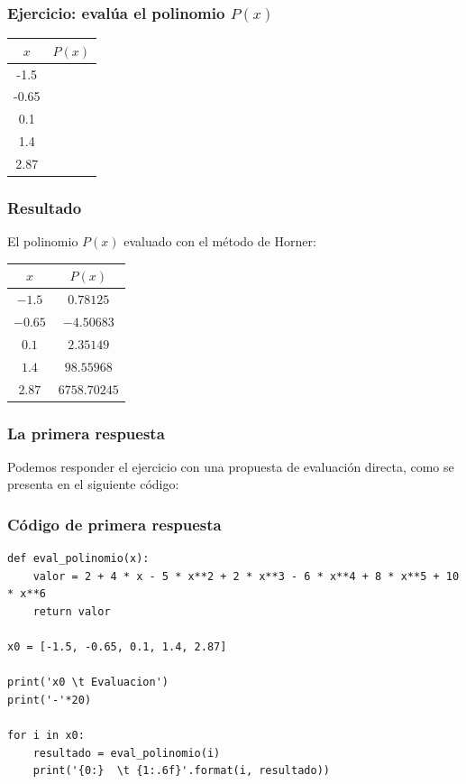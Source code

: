 \documentclass[12pt]{beamer}
\begin{document}
\begin{frame}
\frametitle{Ejercicio: evalúa el polinomio $P(x)$}
\begin{table}
\centering
\begin{tabular}{S | c}
$x$ & $P (x)$ \\
 & \\
 & \\
 & \\
 & \\
 & 
\end{tabular}
\end{table}
\end{frame}
\begin{frame}
\frametitle{Resultado}
El polinomio $P(x)$ evaluado con el método de Horner:
\\
\medskip
\renewcommand{\arraystretch}{1}
\begin{table}
\centering
\begin{tabular}{c | c }
$x$ & $P (x)$ \\
\hline $-1.5$ & $0.78125$ \\
\hline $-0.65$ & $-4.50683$ \\
\hline $0.1$ & $2.35149$ \\
\hline $1.4$ & $98.55968$ \\
\hline $2.87$ & $6758.70245$ \\
\end{tabular}
\end{table}
\end{frame}
\begin{frame}[fragile]
\frametitle{La primera respuesta}
Podemos responder el ejercicio con una propuesta de evaluación directa, como se presenta en el siguiente código:
\end{frame}
\begin{frame}
\frametitle{Código de primera respuesta}
\begin{lstlisting}[caption=Código directo]
def eval_polinomio(x):
    valor = 2 + 4 * x - 5 * x**2 + 2 * x**3 - 6 * x**4 + 8 * x**5 + 10 * x**6
    return valor

x0 = [-1.5, -0.65, 0.1, 1.4, 2.87]

print('x0 \t Evaluacion')
print('-'*20)

for i in x0:
    resultado = eval_polinomio(i)
    print('{0:}  \t {1:.6f}'.format(i, resultado))
\end{lstlisting}
\end{frame}
\end{document}
